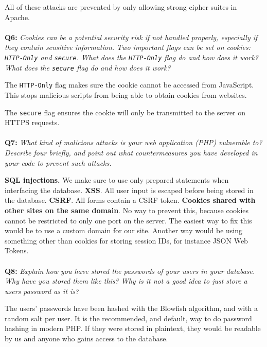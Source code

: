 All of these attacks are prevented by only allowing strong cipher suites in Apache.

\paragraph{}
\textbf{Q6:}
\cprotect\textit{Cookies can be a potential security risk if not handled properly, especially if they contain sensitive information. Two important flags can be set on cookies: \verb/HTTP-Only/ and \verb/secure/. What does the \verb/HTTP-Only/ flag do and how does it work? What does the \verb/secure/ flag do and how does it work?}

The \verb/HTTP-Only/ flag makes sure the cookie cannot be accessed from JavaScript. This stops malicious scripts from being able to obtain cookies from websites.

The \verb/secure/ flag ensures the cookie will only be transmitted to the server on HTTPS requests.

\paragraph{}
\textbf{Q7:}
\textit{What kind of malicious attacks is your web application (PHP) vulnerable to? Describe four briefly, and point out what countermeasures you have developed in your code to prevent such attacks.}

\textbf{SQL injections.} We make sure to use only prepared statements when interfacing the database.
\textbf{XSS}. All user input is escaped before being stored in the database.
\textbf{CSRF}. All forms contain a CSRF token.
\textbf{Cookies shared with other sites on the same domain}. No way to prevent this, because cookies cannot be restricted to only one port on the server.
The easiest way to fix this would be to use a custom domain for our site.
Another way would be using something other than cookies for storing session IDs, for instance JSON Web Tokens.

\paragraph{}
\textbf{Q8:}
\textit{Explain how you have stored the passwords of your users in your database. Why have you stored them like this? Why is it not a good idea to just store a users password as it is?}

The users' passwords have been hashed with the Blowfish\cite{blowfish} algorithm, and with a random salt per user.
It is the recommended, and default, way to do password hashing in modern PHP\cite{php_passwords}.
If they were stored in plaintext, they would be readable by us and anyone who gains access to the database.
